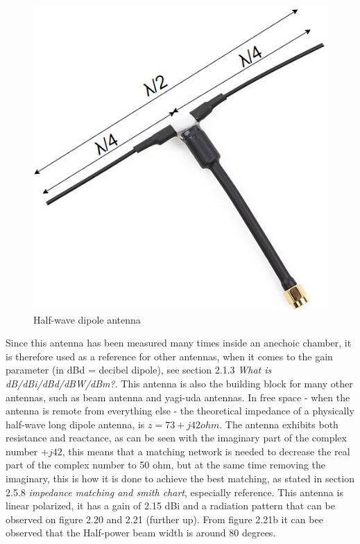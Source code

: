 \begin{figure}[h]
\centering
\includegraphics[scale=0.6]{figures/Dipole.PNG}
\caption{Half-wave dipole antenna}
\end{figure}

Since this antenna has been measured many times inside an anechoic chamber, it is therefore used as a reference for other antennas, when it comes to the gain parameter (in dBd = decibel dipole), see section 2.1.3 \textit{What is dB/dBi/dBd/dBW/dBm?}. This antenna is also the building block for many other antennas, such as beam antenna and yagi-uda antennas. In free space - when the antenna is remote from everything else - the theoretical impedance of a physically half-wave long dipole antenna, is $z=73+j42ohm$. The antenna exhibits both resistance and reactance, as can be seen with the imaginary part of the complex number $+j42$, this means that a matching network is needed to decrease the real part of the complex number to 50 ohm, but at the same time removing the imaginary, this is how it is done to achieve the best matching, as stated in section 2.5.8 \textit{impedance matching and smith chart}, especially reference\cite{ImpedanceMatching}. This antenna is linear polarized, it has a gain of 2.15 dBi and a radiation pattern that can be observed on figure 2.20 and 2.21 (further up). From figure 2.21b it can bee observed that the Half-power beam width is around 80 degrees. 

